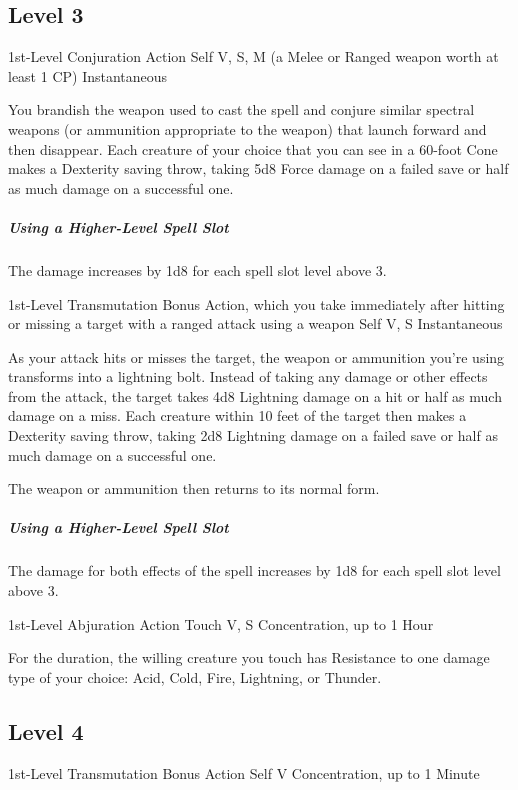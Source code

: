 \documentclass[letterpaper,openany,oneside,twocolumn]{book}
\begin{document}
\subsection*{Level 3}
	{1st-Level Conjuration}
	{Action}
	{Self}
	{V, S, M (a Melee or Ranged weapon worth at least 1 CP)}
	{Instantaneous}

You brandish the weapon used to cast the spell and conjure similar spectral weapons (or ammunition appropriate to the weapon) that launch forward and then disappear. Each creature of your choice that you can see in a 60-foot Cone makes a Dexterity saving throw, taking 5d8 Force damage on a failed save or half as much damage on a successful one.

\subparagraph*{Using a Higher-Level Spell Slot} The damage increases by 1d8 for each spell slot level above 3.

	{1st-Level Transmutation}
	{Bonus Action, which you take immediately after hitting or missing a target with a ranged attack using a weapon}
	{Self}
	{V, S}
	{Instantaneous}

As your attack hits or misses the target, the weapon or ammunition you're using transforms into a lightning bolt. Instead of taking any damage or other effects from the attack, the target takes 4d8 Lightning damage on a hit or half as much damage on a miss. Each creature within 10 feet of the target then makes a Dexterity saving throw, taking 2d8 Lightning damage on a failed save or half as much damage on a successful one.

The weapon or ammunition then returns to its normal form.

\subparagraph*{Using a Higher-Level Spell Slot} The damage for both effects of the spell increases by 1d8 for each spell slot level above 3.

	{1st-Level Abjuration}
	{Action}
	{Touch}
	{V, S}
	{Concentration, up to 1 Hour}

For the duration, the willing creature you touch has Resistance to one damage type of your choice: Acid, Cold, Fire, Lightning, or Thunder.

\subsection*{Level 4}
	{1st-Level Transmutation}
	{Bonus Action}
	{Self}
	{V}
	{Concentration, up to 1 Minute}
\end{document}
